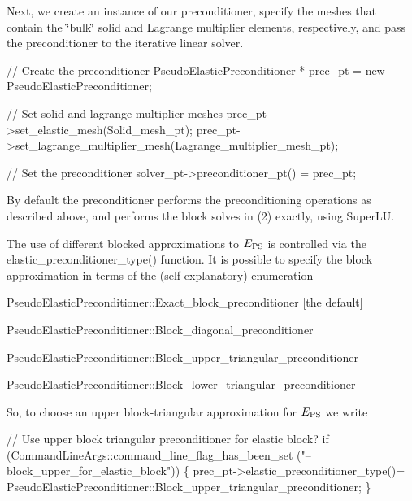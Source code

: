 Next, we create an instance of our preconditioner, specify the meshes that contain the \char`\"{}bulk\char`\"{} solid and Lagrange multiplier elements, respectively, and pass the preconditioner to the iterative linear solver.


\begin{DoxyCodeInclude}

 \textcolor{comment}{// Create the preconditioner}
 PseudoElasticPreconditioner * prec\_pt = \textcolor{keyword}{new} PseudoElasticPreconditioner;

 \textcolor{comment}{// Set solid and lagrange multiplier meshes}
 prec\_pt->set\_elastic\_mesh(Solid\_mesh\_pt);
 prec\_pt->set\_lagrange\_multiplier\_mesh(Lagrange\_multiplier\_mesh\_pt);
 
 \textcolor{comment}{// Set the preconditioner}
 solver\_pt->preconditioner\_pt() = prec\_pt;

\end{DoxyCodeInclude}


By default the preconditioner performs the preconditioning operations as described above, and performs the block solves in (2) exactly, using Super\+LU.

The use of different blocked approximations to $ E_{\rm PS} $ is controlled via the {\ttfamily elastic\+\_\+preconditioner\+\_\+type()} function. It is possible to specify the block approximation in terms of the (self-\/explanatory) enumeration
\begin{DoxyItemize}
\item {\ttfamily Pseudo\+Elastic\+Preconditioner\+::\+Exact\+\_\+block\+\_\+preconditioner} \mbox{[}the default\mbox{]}
\item {\ttfamily Pseudo\+Elastic\+Preconditioner\+::\+Block\+\_\+diagonal\+\_\+preconditioner} 
\item {\ttfamily Pseudo\+Elastic\+Preconditioner\+::\+Block\+\_\+upper\+\_\+triangular\+\_\+preconditioner} 
\item {\ttfamily Pseudo\+Elastic\+Preconditioner\+::\+Block\+\_\+lower\+\_\+triangular\+\_\+preconditioner} 
\end{DoxyItemize}So, to choose an upper block-\/triangular approximation for $ E_{\rm PS} $ we write 
\begin{DoxyCodeInclude}

 \textcolor{comment}{// Use upper block triangular preconditioner for elastic block?}
 \textcolor{keywordflow}{if} (CommandLineArgs::command\_line\_flag\_has\_been\_set
     (\textcolor{stringliteral}{"--block\_upper\_for\_elastic\_block"}))
  \{
   prec\_pt->elastic\_preconditioner\_type()=
    PseudoElasticPreconditioner::Block\_upper\_triangular\_preconditioner;
  \}

\end{DoxyCodeInclude}


